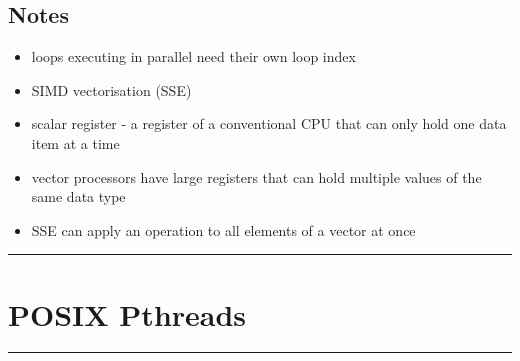 \documentclass[10pt, multicolumn, a4paper]{article}
\begin{document}
\begin{multicols}{2}
	\subsection*{Notes}
	\begin{itemize}
	\item loops executing in parallel need their own loop index
	\item SIMD vectorisation (SSE)
	\item scalar register - a register of a conventional CPU that can only hold one data item at a time
	\item vector processors have large registers that can hold multiple values of the same data type
	\item SSE can apply an operation to all elements of a vector at once
	\end{itemize}
\end{multicols}

\setcounter{section}{6}
\hrule
\section{POSIX Pthreads}
\hrule 
\end{document}
